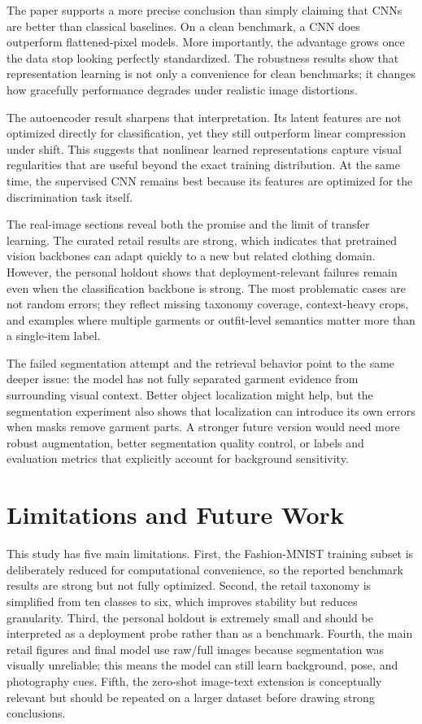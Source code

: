 \documentclass[11pt]{article}
\begin{document}
The paper supports a more precise conclusion than simply claiming that CNNs are better than classical baselines. On a clean benchmark, a CNN does outperform flattened-pixel models. More importantly, the advantage grows once the data stop looking perfectly standardized. The robustness results show that representation learning is not only a convenience for clean benchmarks; it changes how gracefully performance degrades under realistic image distortions.

The autoencoder result sharpens that interpretation. Its latent features are not optimized directly for classification, yet they still outperform linear compression under shift. This suggests that nonlinear learned representations capture visual regularities that are useful beyond the exact training distribution. At the same time, the supervised CNN remains best because its features are optimized for the discrimination task itself.

The real-image sections reveal both the promise and the limit of transfer learning. The curated retail results are strong, which indicates that pretrained vision backbones can adapt quickly to a new but related clothing domain. However, the personal holdout shows that deployment-relevant failures remain even when the classification backbone is strong. The most problematic cases are not random errors; they reflect missing taxonomy coverage, context-heavy crops, and examples where multiple garments or outfit-level semantics matter more than a single-item label.

The failed segmentation attempt and the retrieval behavior point to the same deeper issue: the model has not fully separated garment evidence from surrounding visual context. Better object localization might help, but the segmentation experiment also shows that localization can introduce its own errors when masks remove garment parts. A stronger future version would need more robust augmentation, better segmentation quality control, or labels and evaluation metrics that explicitly account for background sensitivity.

\section{Limitations and Future Work}

This study has five main limitations. First, the Fashion-MNIST training subset is deliberately reduced for computational convenience, so the reported benchmark results are strong but not fully optimized. Second, the retail taxonomy is simplified from ten classes to six, which improves stability but reduces granularity. Third, the personal holdout is extremely small and should be interpreted as a deployment probe rather than as a benchmark. Fourth, the main retail figures and final model use raw/full images because segmentation was visually unreliable; this means the model can still learn background, pose, and photography cues. Fifth, the zero-shot image-text extension is conceptually relevant but should be repeated on a larger dataset before drawing strong conclusions.
\end{document}
